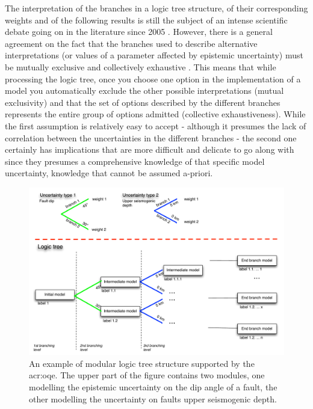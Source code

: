 The interpretation of the branches in a logic tree structure, of their 
corresponding weights and of the following results is still the subject 
of an intense scientific debate going on in the literature since 2005 
\parencite{abrahamson2005,mcguire2005,scherbaum2011,musson2012}.
%
However, there is a general agreement on the fact that the branches used to 
describe alternative interpretations (or values of a parameter affected by
epistemic uncertainty) must be mutually exclusive and collectively exhaustive
\parencite{bommer2008}. 
%
This means that  while processing the logic tree, once you choose one option 
in the implementation of a model you automatically exclude the other possible 
interpretations (mutual exclusivity) and that the set of options described 
by the different branches represents the entire group of options admitted 
(collective exhaustiveness). 
%
While the first assumption is relatively easy to accept - although it presumes 
the lack of correlation between the uncertainties in the different branches - 
the second one certainly has implications that are more difficult and delicate 
to go along with since they presumes a comprehensive knowledge of that specific 
model uncertainty, knowledge that cannot be assumed a-priori. 
%
\begin{figure}[!ht]
\includegraphics[width=14cm]{./Pictures/lts/logic_tree.pdf}
\caption{An example of modular logic tree structure supported by the
    \gls{acr:oqe}. The upper part of the figure contains two modules, one
    modelling the epistemic uncertainty on the dip angle of a fault, the 
    other modelling the uncertainty on faults upper seismogenic depth.}
\label{fig:logic_tree}
\end{figure}
%
